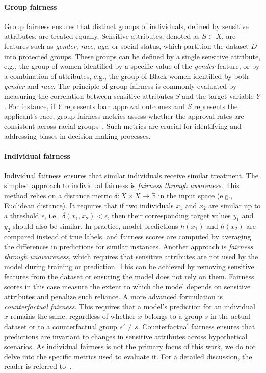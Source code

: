 \paragraph{Group fairness}\label{par:group-fairness}
%
Group fairness ensures that distinct groups of individuals, defined by sensitive attributes, are treated equally.
%
Sensitive attributes, denoted as \( S \subset X \), are features such as \emph{gender}, \emph{race}, \emph{age}, or social status, which partition the dataset \( D \) into protected groups.
%
These groups can be defined by a single sensitive attribute, e.g., the group of women identified by a specific value of the \textit{gender} feature, or by a combination of attributes, e.g., the group of Black women identified by both \textit{gender} and \textit{race}.
%
The principle of group fairness is commonly evaluated by measuring the correlation between sensitive attributes \( S \) and the target variable \( Y \).
%
For instance, if \( Y \) represents loan approval outcomes and \( S \) represents the applicant's race, group fairness metrics assess whether the approval rates are consistent across racial groups~\cite{placeholder}.
%
Such metrics are crucial for identifying and addressing biases in decision-making processes.


\paragraph{Individual fairness}\label{par:individual-fairness}
%
Individual fairness ensures that similar individuals receive similar treatment.
%
The simplest approach to individual fairness is \emph{fairness through awareness}.
%
This method relies on a distance metric \(\delta : X \times X \to \mathbb{R}\) in the input space (e.g., Euclidean distance).
%
It requires that if two individuals \(x_1\) and \(x_2\) are similar up to a threshold \(\epsilon\), i.e., \(\delta(x_1, x_2) < \epsilon\), then their corresponding target values \(y_1\) and \(y_2\) should also be similar.
%
In practice, model predictions \(h(x_1)\) and \(h(x_2)\) are compared instead of true labels, and fairness scores are computed by averaging the differences in predictions for similar instances.
%
Another approach is \emph{fairness through unawareness}, which requires that sensitive attributes are not used by the model during training or prediction.
%
This can be achieved by removing sensitive features from the dataset or ensuring the model does not rely on them.
%
Fairness scores in this case measure the extent to which the model depends on sensitive attributes and penalize such reliance.
%
A more advanced formulation is \emph{counterfactual fairness}.
%
This requires that a model's prediction for an individual \(x\) remains the same, regardless of whether \(x\) belongs to a group \(s\) in the actual dataset or to a counterfactual group \(s' \neq s\).
%
Counterfactual fairness ensures that predictions are invariant to changes in sensitive attributes across hypothetical scenarios.
%
As individual fairness is not the primary focus of this work, we do not delve into the specific metrics used to evaluate it.
%
For a detailed discussion, the reader is referred to~\cite{mehrabi2022fairness}.


